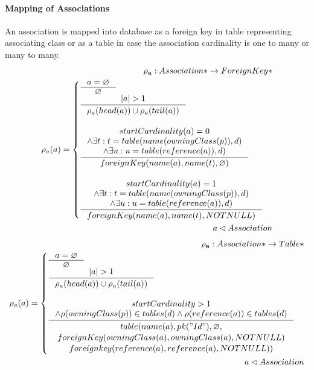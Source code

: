 \documentclass[11pt]{article}
\begin{document}
\paragraph{Mapping of Associations} An association is mapped into database as a foreign key in table representing associating class or as a table in case the association cardinality is one to many or many to many.
\begin{align*}
	\mathbf{\rho_a} : Association* \rightarrow ForeignKey* \\
	\rho_a(a) = \begin{cases}
		\inference{a = \varnothing}{\varnothing}\\
		\inference{|a| > 1}{\rho_{a}(head(a)) \cup \rho_{a}(tail(a))}\\\\
		\inference{ startCardinality(a) = 0 \\ \wedge \exists t : t = table(name(owningClass(p)), d) \\ \wedge \exists u : u = table(reference(a)), d)
		}{
			foreignKey(name(a), name(t),  \varnothing) 
	 	}
  \\ \\
 	 \inference{ startCardinality(a) = 1 \\ \wedge \exists t : t = table(name(owningClass(p)), d) \\ \wedge \exists u : u = table(reference(a)), d)
 	 }{ 
		foreignKey(name(a), name(t),  NOTNULL)
	}
	 \end{cases}\\
	 a \lhd Association
\end{align*}
\begin{align*} 
	\mathbf{\rho_a} : Association* \rightarrow Table* \\
	\rho_a(a) = \begin{cases}
 		\inference{a = \varnothing}{\varnothing}\\
		\inference{|a| > 1}{\rho_{a}(head(a)) \cup \rho_{a}(tail(a))}\\\\
		\inference{  startCardinality > 1 \\ \wedge \rho(owningClass(p)) \in tables(d) \wedge \rho(reference(a)) \in tables(d)
  		}{\begin{gathered}  
		 table(name(a), pk("Id"), \varnothing, \\ foreignKey(owningClass(a),owningClass(a), NOTNULL) \\ foreignkey(reference(a), reference(a), NOTNULL)) 
  		\end{gathered}}  
 	\end{cases}\\
	 a \lhd Association
\end{align*}
\end{document}
